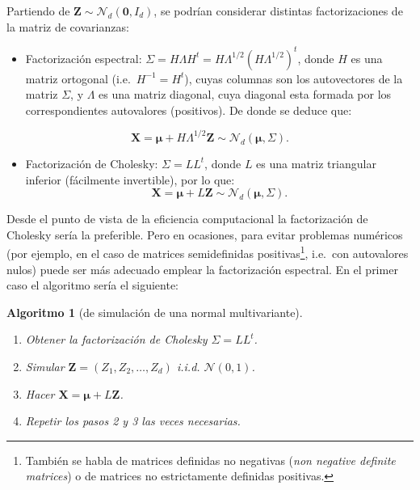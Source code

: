 \documentclass[
  10pt,
]{book}
\providecommand{\tightlist}{%
  \setlength{\itemsep}{0pt}\setlength{\parskip}{0pt}}
\renewcommand{\boldsymbol}[1]{\symbf{#1}}
\renewcommand{\mathbf}[1]{\symbf{#1}}
\theoremstyle{break}
\newtheorem{conjecture}{Algoritmo}[chapter]
\theoremstyle{nonumberplain}
\let\oldfootnote\footnote
\renewcommand\footnote[1]{\oldfootnote{\hspace{2mm}#1}}
\begin{document}
Partiendo de \(\mathbf{Z} \sim \mathcal{N}_d\left( \mathbf{0},I_d\right)\), se podrían considerar distintas factorizaciones de la matriz de covarianzas:

\begin{itemize}
\tightlist
\item
  Factorización espectral:
  \(\Sigma=H\Lambda H^t =H\Lambda^{1/2}(H\Lambda^{1/2})^t\),
  donde \(H\) es una matriz ortogonal (i.e.~\(H^{-1}=H^{t}\)), cuyas columnas son los autovectores de la matriz \(\Sigma\), y \(\Lambda\) es una matriz diagonal, cuya diagonal esta formada por los correspondientes autovalores (positivos). De donde se deduce que:
\end{itemize}

\[\mathbf{X} = \boldsymbol{\mu} + H\Lambda^{1/2}\mathbf{Z} \sim \mathcal{N}_d\left( \boldsymbol{\mu},\Sigma \right).\]

\begin{itemize}
\tightlist
\item
  Factorización de Cholesky: \(\Sigma=LL^t\), donde \(L\) es una matriz triangular inferior (fácilmente invertible), por lo que:
  \[\mathbf{X} = \boldsymbol{\mu} + L\mathbf{Z} 
  \sim \mathcal{N}_d\left( \boldsymbol{\mu},\Sigma \right).\]
\end{itemize}

Desde el punto de vista de la eficiencia computacional la factorización de Cholesky sería la preferible. Pero en ocasiones, para evitar problemas numéricos (por ejemplo, en el caso de matrices semidefinidas positivas\footnote{También se habla de matrices definidas no negativas (\emph{non negative definite matrices}) o de matrices no estrictamente definidas positivas.}, i.e.~con autovalores nulos) puede ser más adecuado emplear la factorización espectral.
En el primer caso el algoritmo sería el siguiente:

\begin{conjecture}[de simulación de una normal multivariante]
\protect\hypertarget{cnj:mnorm-fact}{}\label{cnj:mnorm-fact}

\begin{enumerate}
\def\labelenumi{\arabic{enumi}.}
\item
  Obtener la factorización de Cholesky \(\Sigma=LL^t\).
\item
  Simular \(\mathbf{Z} = \left( Z_1,Z_2,\ldots,Z_d\right)\)
  i.i.d. \(\mathcal{N}\left( 0,1\right)\).
\item
  Hacer \(\mathbf{X} = \boldsymbol{\mu} + L\mathbf{Z}\).
\item
  Repetir los pasos 2 y 3 las veces necesarias.
\end{enumerate}

\end{conjecture}
\end{document}
